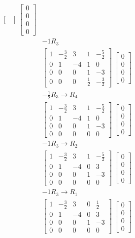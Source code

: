 \documentclass[11pt]{article}
\begin{document}
\begin{flushleft}
\begin{align*}
\begin{bmatrix}
\end{bmatrix}\
\begin{bmatrix}
0 \\ 0 \\ 0 \\ 0
\end{bmatrix}\\
&-1R_3 \\
&\begin{bmatrix}
1 & -\frac{3}{2} & 3 & 1 & -\frac{5}{2} \\
0 & 1 & -4 & 1 & 0 \\
0 & 0 & 0 & 1 & -3 \\
0 & 0 & 0 & \frac{1}{2} & -\frac{3}{2}
\end{bmatrix}\
\begin{bmatrix}
0 \\ 0 \\ 0 \\ 0
\end{bmatrix}\\
&-\frac{1}{2}R_3 \rightarrow R_4 \\
&\begin{bmatrix}
1 & -\frac{3}{2} & 3 & 1 & -\frac{5}{2} \\
0 & 1 & -4 & 1 & 0 \\
0 & 0 & 0 & 1 & -3 \\
0 & 0 & 0 & 0 & 0
\end{bmatrix}\
\begin{bmatrix}
0 \\ 0 \\ 0 \\ 0
\end{bmatrix}\\
&-1R_3 \rightarrow R_2 \\
&\begin{bmatrix}
1 & -\frac{3}{2} & 3 & 1 & -\frac{5}{2} \\
0 & 1 & -4 & 0 & 3 \\
0 & 0 & 0 & 1 & -3 \\
0 & 0 & 0 & 0 & 0
\end{bmatrix}\
\begin{bmatrix}
0 \\ 0 \\ 0 \\ 0
\end{bmatrix}\\
&-1R_3 \rightarrow R_1 \\
&\begin{bmatrix}
1 & -\frac{3}{2} & 3 & 0 & \frac{1}{2} \\
0 & 1 & -4 & 0 & 3 \\
0 & 0 & 0 & 1 & -3 \\
0 & 0 & 0 & 0 & 0
\end{bmatrix}\
\begin{bmatrix}
0 \\ 0 \\ 0 \\ 0
\end{bmatrix}\\
\end{align*}


\end{flushleft}
\end{document}
